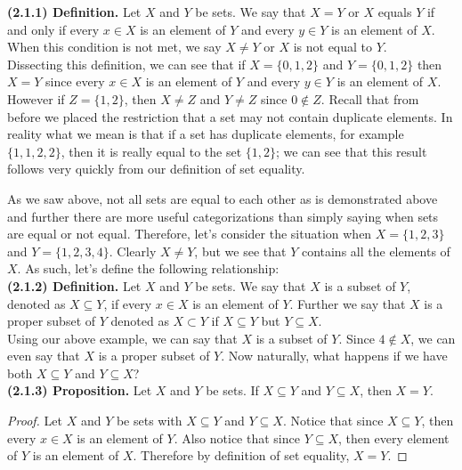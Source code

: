 \documentclass[12pt]{book}
\begin{document}
\noindent\textbf{(2.1.1) Definition.} Let $X$ and $Y$ be sets. We say that $X=Y$ or $X$ equals $Y$ if and only if every $x\in X$ is an element of $Y$ and every $y\in Y$ is an element of $X$. When this condition is not met, we say $X\neq Y$ or $X$ is not equal to $Y$.\\

	Dissecting this definition, we can see that if $X=\{0,1,2\}$ and $Y=\{0,1,2\}$ then $X=Y$ since every $x\in X$ is an element of $Y$ and every $y\in Y$ is an element of $X$. However if $Z=\{1,2\}$, then $X\neq Z$ and $Y\neq Z$ since $0\notin Z$. Recall that from before we placed the restriction that a set may not contain duplicate elements. In reality what we mean is that if a set has duplicate elements, for example $\{1,1,2,2\}$, then it is really equal to the set $\{1,2\}$; we can see that this result follows very quickly from our definition of set equality.

	As we saw above, not all sets are equal to each other as is demonstrated above and further there are more useful categorizations than simply saying when sets are equal or not equal. Therefore, let's consider the situation when $X=\{1,2,3\}$ and $Y=\{1,2,3,4\}$. Clearly $X\neq Y$, but we see that $Y$ contains all the elements of $X$. As such, let's define the following relationship:\\

\noindent\textbf{(2.1.2) Definition.} Let $X$ and $Y$ be sets. We say that $X$ is a subset of $Y$, denoted as $X\subseteq Y$, if every $x\in X$ is an element of $Y$. Further we say that $X$ is a proper subset of $Y$ denoted as $X\subset Y$ if $X\subseteq Y$ but $Y\subseteq X$.\\

	Using our above example, we can say that $X$ is a subset of $Y$. Since $4\notin X$, we can even say that $X$ is a proper subset of $Y$. Now naturally, what happens if we have both $X\subseteq Y$ and $Y\subseteq X$?\\

\noindent\textbf{(2.1.3) Proposition.} Let $X$ and $Y$ be sets. If $X\subseteq Y$ and $Y\subseteq X$, then $X=Y$. 
\begin{proof}
Let $X$ and $Y$ be sets with $X\subseteq Y$ and $Y\subseteq X$. Notice that since $X\subseteq Y$, then every $x\in X$ is an element of $Y$. Also notice that since $Y\subseteq X$, then every element of $Y$ is an element of $X$. Therefore by definition of set equality, $X=Y$.
\end{proof}
\end{document}
